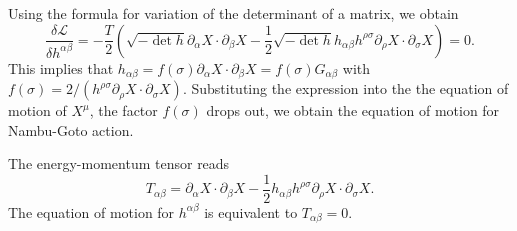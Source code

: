 \documentclass[graybox,envcountchap,sectrefs]{svmono}
\begin{document}
Using the formula for variation of the determinant of a matrix, we obtain
\begin{equation}
\frac{\delta\mathcal{L}}	{\delta h^{\alpha\beta}}=-\frac{T}{2}(\sqrt{-\det h}\partial_{\alpha}X\cdot\partial_{\beta}X-\frac{1}{2}\sqrt{-\det h}h_{\alpha\beta}h^{\rho\sigma}\partial_{\rho}X\cdot\partial_{\sigma}X)=0.
\end{equation}
This implies that $h_{\alpha\beta}=f(\sigma)\partial_{\alpha}X\cdot\partial_{\beta}X=f(\sigma) G_{\alpha\beta}$ with $f(\sigma)=2/(h^{\rho\sigma}\partial_{\rho}X\cdot\partial_{\sigma}X)$. 
Substituting the expression into the the equation of motion of $X^{\mu}$, the factor $f(\sigma)$ drops out, we obtain the equation of motion for Nambu-Goto action.


The energy-momentum tensor reads
\begin{equation}
	T_{\alpha\beta}=\partial_{\alpha}X\cdot\partial_{\beta}X-\frac{1}{2}h_{\alpha\beta}h^{\rho\sigma}\partial_{\rho}X\cdot\partial_{\sigma}X.
\end{equation}
The equation of motion for $h^{\alpha\beta}$ is equivalent to $T_{\alpha\beta}=0$.
\end{document}
